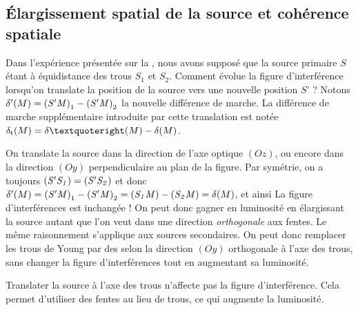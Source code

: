 \documentclass[12pt,fancy]{cours}
\begin{document}
\subsection{Élargissement spatial de la source et cohérence spatiale}
Dans l’expérience présentée sur la , nous avons supposé que la source primaire $S$ étant à équidistance des trous $S_1$ et $S_2$. Comment évolue la figure d’interférence lorsqu’on translate la position de la source vers une nouvelle position $S’$ ? Notons $\delta'(M) = \mathit{(S'M)}_1 - \mathit{(S'M)}_2$ la nouvelle différence de marche. La différence de marche supplémentaire introduite par cette translation  est notée $\delta_{\rm t}(M) = \delta’(M)-\delta(M)$.


On translate la source dans la direction de l'axe optique $(Oz)$, ou encore dans la direction $(Oy)$ perpendiculaire au plan de la figure.
Par symétrie, on a toujours $\mathit{(S'S_1)} = \mathit{(S'S_2)}$ et donc $\delta'(M)=\mathit{(S'M)}_1 - \mathit{(S'M)}_2 = \mathit{(S_1M)} - \mathit{(S_2M)} =  \delta(M)$, et ainsi 
La figure d'interférences est inchangée ! On peut donc gagner en luminosité en élargissant la source autant que l'on veut dans une direction \textit{orthogonale} aux fentes. Le même raisonnement s’applique aux sources secondaires. On peut donc remplacer les trous de Young par des  selon la direction $(Oy)$ orthogonale à l'axe des trous, sans changer la figure d'interférences tout en augmentant sa luminosité.

\begin{prop}\label{prop:translat_perp}
Translater la source  à l'axe des trous n’affecte pas la figure d’interférence. Cela permet d'utiliser des fentes au lieu de trous, ce qui augmente la luminosité.
\end{prop}
\end{document}
